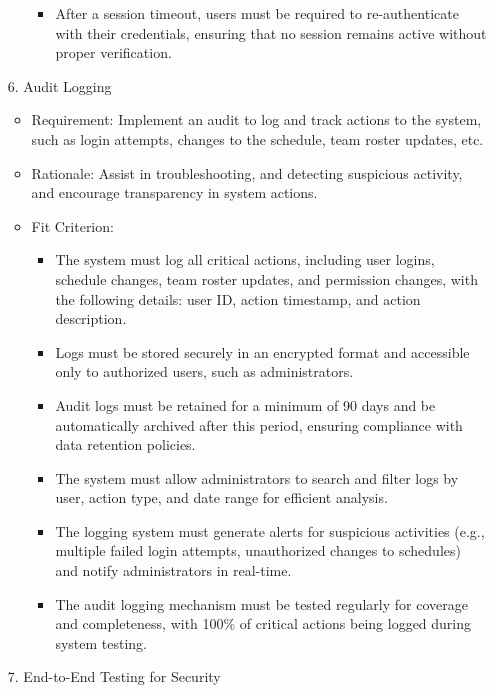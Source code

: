 \documentclass{article}
\begin{document}
\begin{enumerate}
\begin{itemize}
\begin{itemize}
                        \item After a session timeout, users must be required to re-authenticate with their credentials, ensuring that no session remains active without proper verification.
                    \end{itemize}
          \end{itemize}
    \item[6.] Audit Logging
          \begin{itemize}
              \item Requirement: Implement an audit to log and track actions to the system, such as login attempts, changes to the schedule, team roster updates, etc.
              \item Rationale: Assist in troubleshooting, and detecting suspicious activity, and encourage transparency in system actions.
              \item Fit Criterion:
                    \begin{itemize}
                        \item The system must log all critical actions, including user logins, schedule changes, team roster updates, and permission changes, with the following details: user ID, action timestamp, and action description.
                        \item Logs must be stored securely in an encrypted format and accessible only to authorized users, such as administrators.
                        \item Audit logs must be retained for a minimum of 90 days and be automatically archived after this period, ensuring compliance with data retention policies.
                        \item The system must allow administrators to search and filter logs by user, action type, and date range for efficient analysis.
                        \item The logging system must generate alerts for suspicious activities (e.g., multiple failed login attempts, unauthorized changes to schedules) and notify administrators in real-time.
                        \item The audit logging mechanism must be tested regularly for coverage and completeness, with 100\% of critical actions being logged during system testing.
                    \end{itemize}
          \end{itemize}
    \item[7.] End-to-End Testing for Security

\end{enumerate}
\end{document}
